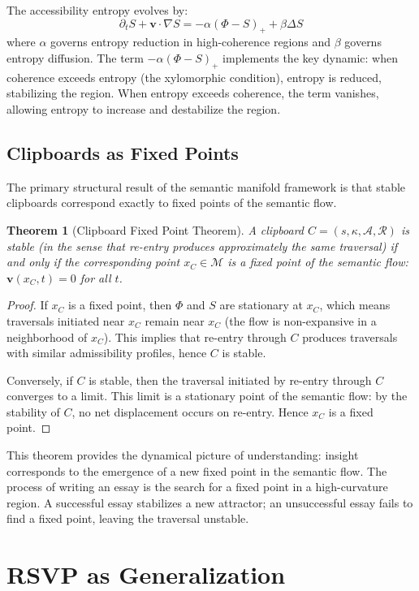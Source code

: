 \documentclass[12pt,oneside]{book}
\theoremstyle{plain}
\newtheorem{theorem}{Theorem}[chapter]
\theoremstyle{definition}
\theoremstyle{plain}
\newcommand{\cA}{\mathcal{A}}
\newcommand{\cM}{\mathcal{M}}
\newcommand{\cR}{\mathcal{R}}
\begin{document}
The accessibility entropy evolves by:
\[
\partial_t S + \mathbf{v} \cdot \nabla S = -\alpha (\Phi - S)_+ + \beta \Delta S
\]
where $\alpha$ governs entropy reduction in high-coherence regions and $\beta$ governs entropy diffusion. The term $-\alpha (\Phi - S)_+$ implements the key dynamic: when coherence exceeds entropy (the xylomorphic condition), entropy is reduced, stabilizing the region. When entropy exceeds coherence, the term vanishes, allowing entropy to increase and destabilize the region.

\section{Clipboards as Fixed Points}

The primary structural result of the semantic manifold framework is that stable clipboards correspond exactly to fixed points of the semantic flow.

\begin{theorem}[Clipboard Fixed Point Theorem]
A clipboard $C = (s, \kappa, \cA, \cR)$ is \emph{stable} (in the sense that re-entry produces approximately the same traversal) if and only if the corresponding point $x_C \in \cM$ is a fixed point of the semantic flow: $\mathbf{v}(x_C, t) = 0$ for all $t$.
\end{theorem}

\begin{proof}
If $x_C$ is a fixed point, then $\Phi$ and $S$ are stationary at $x_C$, which means traversals initiated near $x_C$ remain near $x_C$ (the flow is non-expansive in a neighborhood of $x_C$). This implies that re-entry through $C$ produces traversals with similar admissibility profiles, hence $C$ is stable.

Conversely, if $C$ is stable, then the traversal initiated by re-entry through $C$ converges to a limit. This limit is a stationary point of the semantic flow: by the stability of $C$, no net displacement occurs on re-entry. Hence $x_C$ is a fixed point.
\end{proof}

This theorem provides the dynamical picture of understanding: insight corresponds to the emergence of a new fixed point in the semantic flow. The process of writing an essay is the search for a fixed point in a high-curvature region. A successful essay stabilizes a new attractor; an unsuccessful essay fails to find a fixed point, leaving the traversal unstable.

\chapter{RSVP as Generalization}
\label{ch:rsvp}
\end{document}
